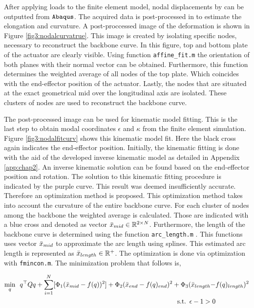 After applying loads to the finite element model, nodal displacements by can be outputted from $\verb+Abaqus+$. The acquired data is post-processed in \MATLAB to estimate the elongation and curvature. A post-proccessed image of the deformation is shown in Figure \ref{fig3:nodalcurvatrue}. This image is created by isolating specific nodes, necessary to reconstruct the backbone curve. In this figure, top and bottom plate of the actuator are clearly visible. Using \MATLAB function \verb+affine_fit.m+ \cite{affinefit} the orientation of both planes with their normal vector can be obtained. Furthermore, this function determines the weighted average of all nodes of the top plate. Which coincides with the end-effector position of the actuator. Lastly, the nodes that are situated at the exact geometrical mid over the longitudinal axis are isolated. These clusters of nodes are used to reconstruct the backbone curve. 


The post-processed image can be used for kinematic model fitting. This is the last step to obtain modal coordinates $\epsilon$ and $\kappa$ from the finite element simulation. Figure \ref{fig3:nodalfitcurv} shows this kinematic model fit. Here the black cross again indicates the end-effector position. Initially, the kinematic fitting is done with the aid of the developed inverse kinematic model as detailed in Appendix \ref{app:chap2}. An inverse kinematic solution can be found based on the end-effector position and rotation. The solution to this kinematic fitting procedure is indicated by the purple curve. This result was deemed insufficiently accurate. Therefore an optimization method is proposed. This optimization method takes into account the curvature of the entire backbone curve. For each cluster of nodes among the backbone the weighted average is calculated. Those are indicated with a blue cross and denoted as vector $\Bar{x}_{mid} \in \mathbb{R}^{2\times N}$. Furthermore, the length of the backbone curve is determined using the function \verb+arc_length.m+ \cite{arclength}. This functions uses vector $\Bar{x}_{mid}$ to approximate the arc length using splines. This estimated arc length is represented as  $\Bar{x}_{length} \in \mathbb{R}^+ $. The optimization is done via optimization with \verb+fmincon.m+. The minimization problem that follows is,


\begin{equation}
\begin{aligned}
\min_{q} \hspace{5pt}  q^\top Q q  + \sum_{i=1}^{N}[\Phi_1(\Bar{x}_{mid} - f(q))^2] +   \Phi_2(\Bar{x}_{end}  - f(q)_{end})^2 +  \Phi_3(\Bar{x}_{length} - & f(q)_{length})^2  \\ 
\text{s.t.} \hspace{5pt} \epsilon - 1 > 0
\end{aligned}
\label{eq3:optim}
\end{equation}


